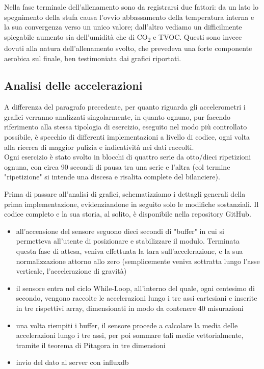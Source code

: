 \documentclass[fleqn,10pt]{SelfArx} %
\begin{document}
Nella fase terminale dell'allenamento sono da registrarsi due fattori: da un lato lo spegnimento della 
stufa causa l'ovvio abbassamento della temperatura interna e la sua convergenza verso un unico valore; 
dall'altro vediamo un difficilmente spiegabile aumento sia dell'umidità che di CO\textsubscript{2} e TVOC.
Questi sono invece dovuti alla natura dell'allenamento svolto, che prevedeva una forte componente aerobica 
sul finale, ben testimoniata dai grafici riportati.\\

\subsection{Analisi delle accelerazioni}

A differenza del paragrafo precedente, per quanto riguarda gli accelerometri i grafici verranno analizzati 
singolarmente, in quanto ognuno, pur facendo riferimento alla stessa tipologia di esercizio, eseguito nel 
modo più controllato possibile, è specchio di differenti implementazioni a livello di codice, ogni volta alla 
ricerca di maggior pulizia e indicatività nei dati raccolti.\\
Ogni esercizio è stato svolto in blocchi di quattro serie da otto/dieci ripetizioni ognuna, con circa 90 
secondi di pausa tra una serie e l'altra (col termine "ripetizione" si intende una discesa e risalita complete 
del bilanciere).

Prima di passare all'analisi di grafici, schematizziamo i dettagli generali della prima implementazione, 
evidenziandone in seguito solo le modifiche sostanziali. Il codice completo e la sua storia, al solito, 
è disponibile nella repository GitHub. 

\begin{itemize}[noitemsep] %
	\item all'accensione del sensore seguono dieci secondi di "buffer" in cui si permetteva all'utente di 
	posizionare e stabilizzare il modulo. Terminata questa fase di attesa, veniva effettuata la tara 
	sull'accelerazione, e la sua normalizzazione attorno allo zero (semplicemente veniva sottratta lungo 
	l'asse verticale, l'accelerazione di gravità)
	\item il sensore entra nel ciclo While-Loop, all'interno del quale, ogni centesimo di secondo, vengono 
	raccolte le accelerazioni lungo i tre assi cartesiani e inserite in tre rispettivi array, dimensionati in 
	modo da contenere 40 misurazioni
	\item una volta riempiti i buffer, il sensore procede a calcolare la media delle accelerazioni lungo i 
	tre assi, per poi sommare tali medie vettorialmente, tramite il teorema di Pitagora in tre dimensioni
	\item invio del dato al server con influxdb
\end{itemize}
\end{document}
